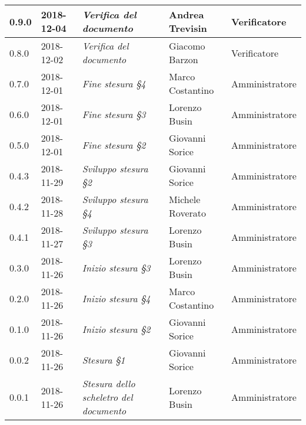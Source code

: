 \begin{longtable}{C{2cm}|C{2.5cm}|C{4.5cm}|C{2.5cm}|C{3cm}}
		0.9.0 & 2018-12-04 &\emph{Verifica del documento} & Andrea Trevisin & Verificatore \\
		\hline
		
	    0.8.0 & 2018-12-02 & \emph{Verifica del documento} & Giacomo Barzon & Verificatore  \\
		\hline
		
		0.7.0 & 2018-12-01 & \emph{Fine stesura §4} & Marco Costantino & Amministratore  \\
		\hline
		
		0.6.0 & 2018-12-01 & \emph{Fine stesura §3} & Lorenzo Busin & Amministratore  \\
		\hline
		
	 	0.5.0 & 2018-12-01 & \emph{Fine stesura §2} & Giovanni Sorice & Amministratore  \\
		\hline
		
		0.4.3 & 2018-11-29 & \emph{Sviluppo stesura §2} & Giovanni Sorice & Amministratore  \\
		\hline
		
		0.4.2 & 2018-11-28 & \emph{Sviluppo stesura §4} & Michele Roverato & Amministratore  \\
		\hline
		
		 0.4.1 & 2018-11-27 &\emph{Sviluppo stesura §3} & Lorenzo Busin & Amministratore \\
		\hline
		
		0.3.0 & 2018-11-26 & \emph{Inizio stesura §3} & Lorenzo Busin & Amministratore  \\
		\hline
		
		0.2.0 & 2018-11-26 & \emph{Inizio stesura §4} & Marco Costantino & Amministratore  \\
		\hline
		
		0.1.0 & 2018-11-26 & \emph{Inizio stesura §2} & Giovanni Sorice & Amministratore \\
		\hline
		
		0.0.2 & 2018-11-26 & \emph{Stesura §1} & Giovanni Sorice & Amministratore  \\
		\hline
		
		0.0.1 & 2018-11-26 & \emph{Stesura dello scheletro del documento} & Lorenzo Busin & Amministratore \\
	
	
\end{longtable}


\clearpage